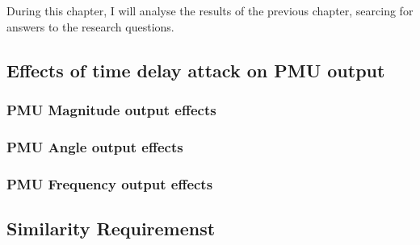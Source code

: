 During this chapter, I will analyse the results of the previous chapter, searcing for answers to the research questions.

\subsection{Effects of time delay attack on PMU output}

\subsubsection{PMU Magnitude output effects}
\subsubsection{PMU Angle output effects}
\subsubsection{PMU Frequency output effects}

\subsection{Similarity Requiremenst}
